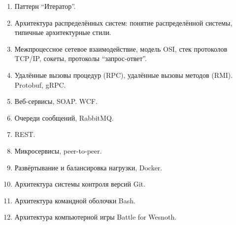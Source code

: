 \documentclass[a5paper]{article}
\begin{document}
\begin{enumerate}
    \item Паттерн ``Итератор''.
    \item Архитектура распределённых систем: понятие распределённой системы, типичные архитектурные стили.
    \item Межпроцессное сетевое взаимодействие, модель OSI, стек протоколов TCP/IP, сокеты, протоколы ``запрос-ответ''.
    \item Удалённые вызовы процедур (RPC), удалённые вызовы методов (RMI). Protobuf, gRPC.
    \item Веб-сервисы, SOAP. WCF.
    \item Очереди сообщений, RabbitMQ.
    \item REST.
    \item Микросервисы, peer-to-peer.
    \item Развёртывание и балансировка нагрузки, Docker.
    \item Архитектура системы контроля версий Git.
    \item Архитектура командной оболочки Bash.
    \item Архитектура компьютерной игры Battle for Wesnoth.

\end{enumerate}
\end{document}
